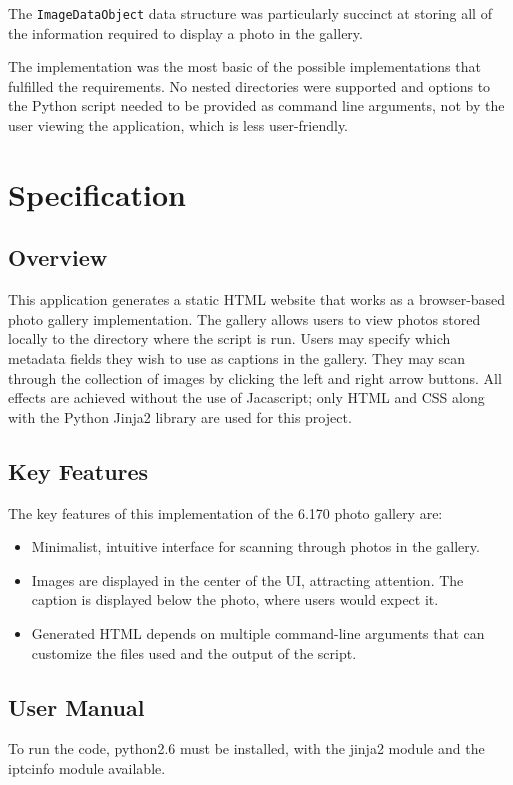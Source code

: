 \documentclass[11pt,letterpaper]{article}
\begin{document}
The \texttt{ImageDataObject} data structure was particularly succinct at storing all of the information required to display a photo in the gallery.

The implementation was the most basic of the possible implementations that fulfilled the requirements. No nested directories were supported and options to the Python script needed to be provided as command line arguments, not by the user viewing the application, which is less user-friendly.
\section{Specification}
\subsection{Overview}
This application generates a static HTML website that works as a browser-based photo gallery implementation. The gallery allows users to view photos stored locally to the directory where the script is run. Users may specify which metadata fields they wish to use as captions in the gallery. They may scan through the collection of images by clicking the left and right arrow buttons. All effects are achieved without the use of Jacascript; only HTML and CSS along with the Python Jinja2 library are used for this project.
\subsection{Key Features}
The key features of this implementation of the 6.170 photo gallery are:
\begin{itemize}
\item Minimalist, intuitive interface for scanning through photos in the gallery.
\item Images are displayed in the center of the UI, attracting attention. The caption is displayed below the photo, where users would expect it.
\item Generated HTML depends on multiple command-line arguments that can customize the files used and the output of the script.
\end{itemize}
\subsection{User Manual}
To run the code, python2.6 must be installed, with the jinja2 module and the iptcinfo module available.
\end{document}
